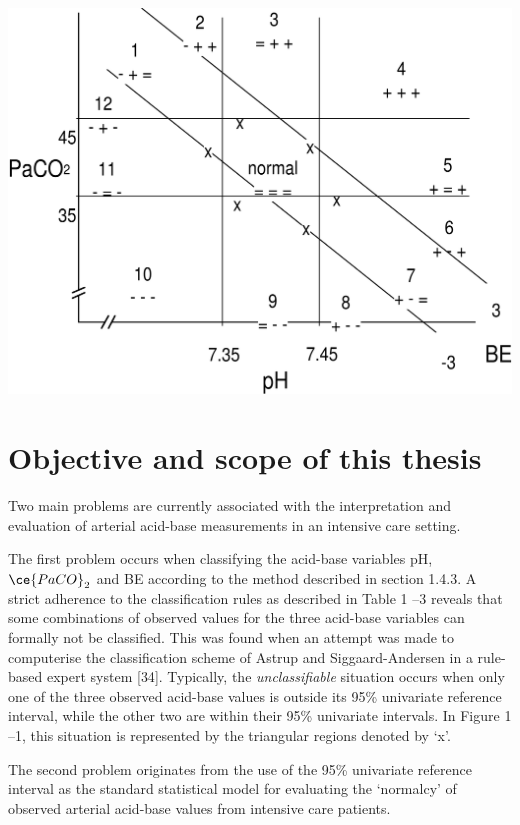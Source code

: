 \documentclass[
  12pt,
  a4paperpaper,
]{report}
\begin{document}
\includegraphics[width=1\textwidth,height=\textheight]{figures/H_01_image1.png}

\hypertarget{objective-and-scope-of-this-thesis}{%
\section{Objective and scope of this
thesis}\label{objective-and-scope-of-this-thesis}}

Two main problems are currently associated with the interpretation and
evaluation of arterial acid-base measurements in an intensive care
setting.

The first problem occurs when classifying the acid-base variables pH,
\(\ce{PaCO}_{2}\) and BE according to the method described in section
1.4.3. A strict adherence to the classification rules as described in
Table 1 --3 reveals that some combinations of observed values for the
three acid-base variables can formally not be classified. This was found
when an attempt was made to computerise the classification scheme of
Astrup and Siggaard-Andersen in a rule-based expert system {[}34{]}.
Typically, the \emph{unclassifiable} situation occurs when only one of
the three observed acid-base values is outside its 95\% univariate
reference interval, while the other two are within their 95\% univariate
intervals. In Figure 1 --1, this situation is represented by the
triangular regions denoted by `x'.

The second problem originates from the use of the 95\% univariate
reference interval as the standard statistical model for evaluating the
`normalcy' of observed arterial acid-base values from intensive care
patients.
\end{document}
